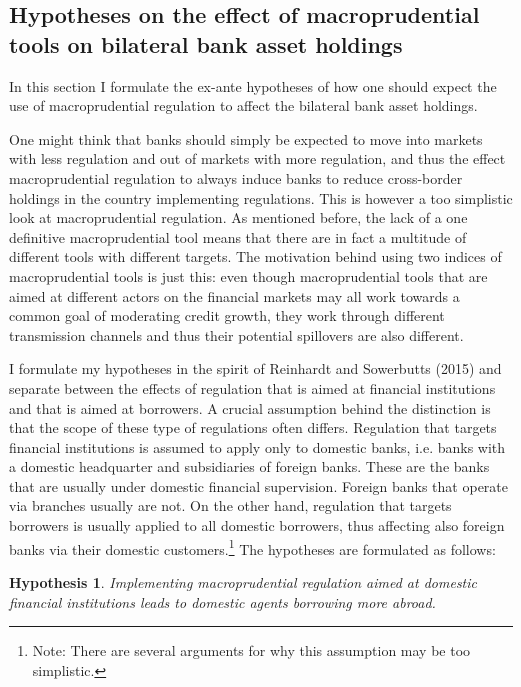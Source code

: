 \documentclass[12pt,a4paper]{article}
\newtheorem{hyp}{Hypothesis}
\begin{document}
\subsection{Hypotheses on the effect of macroprudential tools on bilateral bank asset holdings}

In this section I formulate the ex-ante hypotheses of how one should expect the use of macroprudential regulation to affect the bilateral bank asset holdings. 

One might think that banks should simply be expected to move into markets with less regulation and out of markets with more regulation, and thus the effect macroprudential regulation to always induce banks to reduce cross-border holdings in the country implementing regulations. This is however a too simplistic look at macroprudential regulation. As mentioned before, the lack of a one definitive macroprudential tool means that there are in fact a multitude of different tools with different targets. The motivation behind using two indices of macroprudential tools is just this: even though macroprudential tools that are aimed at different actors on the financial markets may all work towards a common goal of moderating credit growth, they work through different transmission channels and thus their potential spillovers are also different. 

I formulate my hypotheses in the spirit of Reinhardt and Sowerbutts (2015) and separate between the effects of regulation that is aimed at financial institutions and that is aimed at borrowers. A crucial assumption behind the distinction is that the scope of these type of regulations often differs. Regulation that targets financial institutions is assumed to apply only to domestic banks, i.e. banks with a domestic headquarter and subsidiaries of foreign banks. These are the banks that are usually under domestic financial supervision. Foreign banks that operate via branches usually are not. On the other hand, regulation that targets borrowers is usually applied to all domestic borrowers, thus affecting also foreign banks via their domestic customers.\footnote{Note: There are several arguments for why this assumption may be too simplistic.} The hypotheses are formulated as follows:

\begin{hyp} \label{hyp:1}
Implementing macroprudential regulation aimed at domestic financial institutions leads to domestic agents borrowing more abroad.
\end{hyp}
\end{document}
